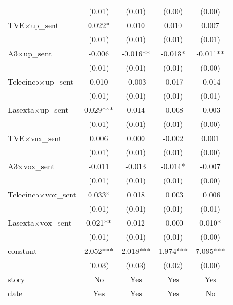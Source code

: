 \begin{tabular}{l*{4}{c}}
                    &      (0.01)   &      (0.01)   &      (0.00)   &      (0.00)   \\
TVE$\times$up\_sent  &       0.022*  &       0.010   &       0.010   &       0.007   \\
                    &      (0.01)   &      (0.01)   &      (0.01)   &      (0.01)   \\
A3$\times$up\_sent   &      -0.006   &      -0.016** &      -0.013*  &      -0.011** \\
                    &      (0.01)   &      (0.01)   &      (0.01)   &      (0.00)   \\
Telecinco$\times$up\_sent&       0.010   &      -0.003   &      -0.017   &      -0.014   \\
                    &      (0.01)   &      (0.01)   &      (0.01)   &      (0.01)   \\
Lasexta$\times$up\_sent&       0.029***&       0.014   &      -0.008   &      -0.003   \\
                    &      (0.01)   &      (0.01)   &      (0.01)   &      (0.00)   \\
TVE$\times$vox\_sent &       0.006   &       0.000   &      -0.002   &       0.001   \\
                    &      (0.01)   &      (0.01)   &      (0.01)   &      (0.00)   \\
A3$\times$vox\_sent  &      -0.011   &      -0.013   &      -0.014*  &      -0.007   \\
                    &      (0.01)   &      (0.01)   &      (0.01)   &      (0.00)   \\
Telecinco$\times$vox\_sent&       0.033*  &       0.018   &      -0.003   &      -0.006   \\
                    &      (0.01)   &      (0.01)   &      (0.01)   &      (0.01)   \\
Lasexta$\times$vox\_sent&       0.021** &       0.012   &      -0.000   &       0.010*  \\
                    &      (0.01)   &      (0.01)   &      (0.01)   &      (0.00)   \\
constant            &       2.052***&       2.018***&       1.974***&       7.095***\\
                    &      (0.03)   &      (0.03)   &      (0.02)   &      (0.00)   \\
\midrule
story               &          No   &         Yes   &         Yes   &         Yes   \\
date                &         Yes   &         Yes   &         Yes   &          No   \\

\end{tabular}

